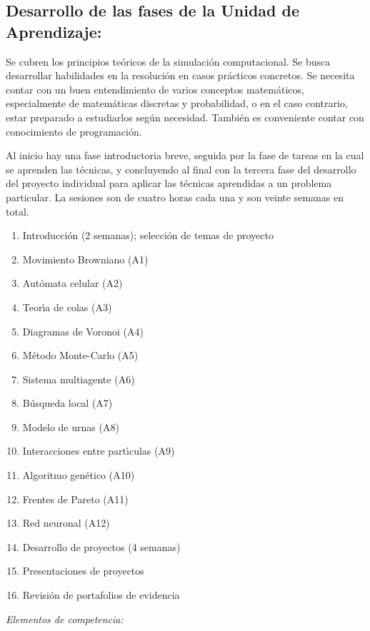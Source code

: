 \documentclass[10 pt]{article}
\begin{document}
\subsection{Desarrollo de las fases de la Unidad de Aprendizaje:}

Se cubren los principios te\'{o}ricos de la simulaci\'{o}n
computacional. Se busca desarrollar habilidades en la resoluci\'{o}n
en casos pr\'{a}cticos concretos. Se necesita contar con un buen
entendimiento de varios conceptos matem\'{a}ticos, especialmente
de matem\'{a}ticas discretas y probabilidad, o en el caso contrario,
estar preparado a estudiarlos seg\'{u}n necesidad. Tambi\'{e}n es
conveniente contar con conocimiento de programaci\'{o}n.

Al inicio hay una fase introductoria breve, seguida por la fase de
tareas en la cual se aprenden las t\'{e}cnicas, y concluyendo al final
con la tercera fase del desarrollo del proyecto individual para
aplicar las t\'{e}cnicas aprendidas a un problema particular. La
sesiones son de cuatro horas cada una y son veinte semanas en total.
\begin{enumerate}[itemsep=-3pt]
\item{Introducci\'{o}n (2 semanas); selecci\'{o}n de temas de proyecto}
\item{Movimiento Browniano (A1)}
\item{Aut\'{o}mata celular (A2)}
\item{Teor\'{\i}a de colas (A3)}
\item{Diagramas de Voronoi (A4)}
\item{M\'{e}todo Monte-Carlo (A5)}
\item{Sistema multiagente (A6)}
\item{B\'{u}squeda local (A7)}
\item{Modelo de urnas (A8)}
\item{Interacciones entre part\'{\i}culas (A9)}
\item{Algoritmo gen\'{e}tico (A10)}
\item{Frentes de Pareto (A11)}
\item{Red neuronal (A12)}
\item{Desarrollo de proyectos (4 semanas)}  
\item{Presentaciones de proyectos}
\item{Revisi\'{o}n de portafolios de evidencia}
\end{enumerate}

{\em Elementos de competencia:}


\end{document}

